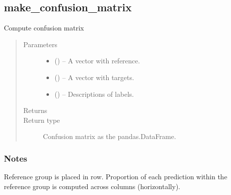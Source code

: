 \documentclass[letterpaper,10pt,english]{sphinxmanual}
\begin{document}
\subsection{make\_confusion\_matrix}
\label{\detokenize{api/ucf.make_confusion_matrix:make-confusion-matrix}}\label{\detokenize{api/ucf.make_confusion_matrix::doc}}

\begin{fulllineitems}
\label{\detokenize{api/ucf.make_confusion_matrix:ucf.make_confusion_matrix}}
Compute confusion matrix
\begin{quote}\begin{description}
\item[{Parameters}] \leavevmode\begin{itemize}
\item {} 
 () -- A vector with reference.

\item {} 
 () -- A vector with targets.

\item {} 
 () -- Descriptions of labels.

\end{itemize}

\item[{Returns}] \leavevmode


\item[{Return type}] \leavevmode
Confusion matrix as the pandas.DataFrame.

\end{description}\end{quote}
\subsubsection*{Notes}

Reference group is placed in row. Proportion of each prediction
within the reference group is computed across columns (horizontally).

\end{fulllineitems}
\end{document}
